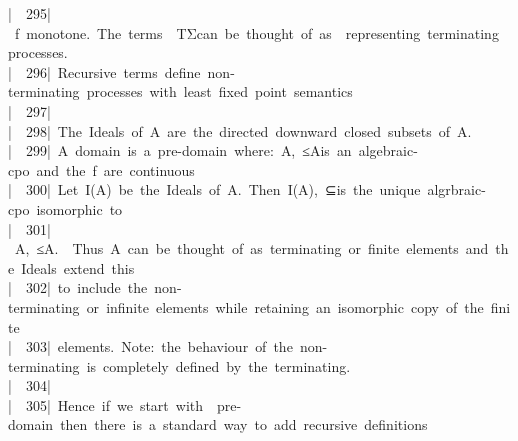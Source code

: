 \documentclass{article}
\newcommand{\syntaxCOMMENTA}[1]{\textcolor[rgb]{0.8,0.0,0.0}{#1}}
\newcommand{\syntaxCOMMENTA}[1]{\textcolor[rgb]{0.8,0.0,0.0}{#1}}
\newcommand{\syntaxCOMMENTA}[1]{\textcolor[rgb]{0.8,0.0,0.0}{#1}}
\newcommand{\syntaxCOMMENTA}[1]{\textcolor[rgb]{0.8,0.0,0.0}{\textbf{#1}}}
\newcommand{\syntaxCOMMENTA}[1]{\textcolor[rgb]{0.8,0.0,0.0}{#1}}
\newcommand{\syntaxCOMMENTA}[1]{\textcolor[rgb]{0.8,0.0,0.0}{#1}}
\newcommand{\syntaxCOMMENTA}[1]{\textcolor[rgb]{0.0,0.0,0.0}{#1}}
\newcommand{\gutter}[1]{\textcolor[rgb]{0,0,0}{{|}#1}}
\newcommand{\gutterH}[1]{\textcolor[rgb]{1,0,0}{{|}#1}}
\begin{document}
\gutterH{\ \ 295{|}\ }\syntaxCOMMENTA{f{\ }monotone.{\ }The{\ }terms{\ }{\ }T\usebox{\underscorebox}\usebox{\opencurlybracket}Σ\usebox{\closecurlybracket}{\ }can{\ }be{\ }thought{\ }of{\ }as{\ }{\ }representing{\ }terminating{\ }processes.{\ }}\hspace*{\fill}\\
\gutter{\ \ 296{|}\ }\syntaxCOMMENTA{Recursive{\ }terms{\ }define{\ }non{-}terminating{\ }processes{\ }with{\ }least{\ }fixed{\ }point{\ }semantics}\hspace*{\fill}\\
\gutter{\ \ 297{|}\ }\hspace*{\fill}\\
\gutter{\ \ 298{|}\ }\syntaxCOMMENTA{The{\ }Ideals{\ }of{\ }A{\ }are{\ }the{\ }directed{\ }downward{\ }closed{\ }subsets{\ }of{\ }A.}\hspace*{\fill}\\
\gutter{\ \ 299{|}\ }\syntaxCOMMENTA{A{\ }domain{\ }is{\ }a{\ }pre{-}domain{\ }where:{\ }\usebox{\lessthan}A,{\ }≤\usebox{\underscorebox}A\usebox{\greaterthan}{\ }is{\ }an{\ }algebraic{-}cpo{\ }and{\ }the{\ }f{\ }are{\ }continuous}\hspace*{\fill}\\
\gutterH{\ \ 300{|}\ }\syntaxCOMMENTA{Let{\ }I(A){\ }be{\ }the{\ }Ideals{\ }of{\ }A.{\ }Then{\ }\usebox{\lessthan}I(A),{\ }⊆\usebox{\greaterthan}{\ }is{\ }the{\ }unique{\ }algrbraic{-}cpo{\ }isomorphic{\ }to{\ }}\hspace*{\fill}\\
\gutter{\ \ 301{|}\ }\syntaxCOMMENTA{\usebox{\lessthan}A,{\ }≤\usebox{\underscorebox}A\usebox{\greaterthan}.{\ }{\ }Thus{\ }A{\ }can{\ }be{\ }thought{\ }of{\ }as{\ }terminating{\ }or{\ }finite{\ }elements{\ }and{\ }the{\ }Ideals{\ }extend{\ }this{\ }}\hspace*{\fill}\\
\gutter{\ \ 302{|}\ }\syntaxCOMMENTA{to{\ }include{\ }the{\ }non{-}terminating{\ }or{\ }infinite{\ }elements{\ }while{\ }retaining{\ }an{\ }isomorphic{\ }copy{\ }of{\ }the{\ }finite}\hspace*{\fill}\\
\gutter{\ \ 303{|}\ }\syntaxCOMMENTA{elements.{\ }Note:{\ }the{\ }behaviour{\ }of{\ }the{\ }non{-}terminating{\ }is{\ }completely{\ }defined{\ }by{\ }the{\ }terminating.}\hspace*{\fill}\\
\gutter{\ \ 304{|}\ }\hspace*{\fill}\\
\gutterH{\ \ 305{|}\ }\syntaxCOMMENTA{Hence{\ }if{\ }we{\ }start{\ }with{\ }{\ }pre{-}domain{\ }then{\ }there{\ }is{\ }a{\ }standard{\ }way{\ }to{\ }add{\ }recursive{\ }definitions}\hspace*{\fill}\\
\end{document}
